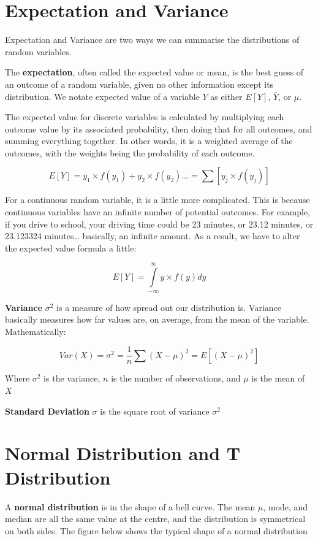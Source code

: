 \documentclass[
  a4paper,
]{report}
\begin{document}
\section{Expectation and Variance}\label{expectation-and-variance}

Expectation and Variance are two ways we can summarise the distributions
of random variables.

The \textbf{expectation}, often called the expected value or mean, is
the best guess of an outcome of a random variable, given no other
information except its distribution. We notate expected value of a
variable \(Y\) as either \(E[Y]\), \(\bar{Y}\), or \(\mu\).

The expected value for discrete variables is calculated by multiplying
each outcome value by its associated probability, then doing that for
all outcomes, and summing everything together. In other words, it is a
weighted average of the outcomes, with the weights being the probability
of each outcome.

\[
E[Y] = y_1 \times f(y_1) + y_2 \times f(y_2)... = \sum [y_j \times f(y_j)]
\]

For a continuous random variable, it is a little more complicated. This
is because continuous variables have an infinite number of potential
outcomes. For example, if you drive to school, your driving time could
be 23 minutes, or 23.12 minutes, or 23.123324 minutes\ldots{} basically,
an infinite amount. As a result, we have to alter the expected value
formula a little:

\[
E[Y] = \int\limits_{-∞}^∞ y \times f(y)dy
\]

\textbf{Variance} \(\sigma^2\) is a measure of how spread out our
distribution is. Variance basically measures how far values are, on
average, from the mean of the variable. Mathematically:

\[
Var(X) = \sigma^2 = \frac{1}{n} \sum (X-\mu)^2 = E[(X - \mu)^2]
\]

Where \(\sigma^2\) is the variance, \(n\) is the number of observations,
and \(\mu\) is the mean of \(X\)

\textbf{Standard Deviation} \(\sigma\) is the square root of variance
\(\sigma^2\)

\section{Normal Distribution and T
Distribution}\label{normal-distribution-and-t-distribution}

A \textbf{normal distribution} is in the shape of a bell curve. The mean
\(\mu\), mode, and median are all the same value at the centre, and the
distribution is symmetrical on both sides. The figure below shows the
typical shape of a normal distribution
\end{document}
